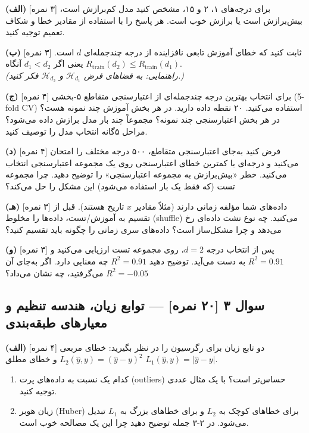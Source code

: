 \documentclass[12pt,a4paper]{article}
\begin{document}
\textbf{(الف)} [۳ نمره] برای درجه‌های ۱، ۲ و ۱۵، مشخص کنید مدل کم‌برازش است، بیش‌برازش است یا برازش خوب است. هر پاسخ را با استفاده از مقادیر خطا و شکاف تعمیم توجیه کنید.

\bigskip

\textbf{(ب)} [۳ نمره] ثابت کنید که خطای آموزش تابعی نافزاینده از درجه چندجمله‌ای $d$ است. یعنی اگر $d_1 < d_2$ آنگاه $R_{\text{train}}(d_2) \leq R_{\text{train}}(d_1)$.\\
\textit{(راهنمایی: به فضاهای فرض $\mathcal{H}_{d_1}$ و $\mathcal{H}_{d_2}$ فکر کنید.)}

\bigskip

\textbf{(ج)} [۴ نمره] برای انتخاب بهترین درجه چندجمله‌ای از اعتبارسنجی متقاطع ۵-بخشی (5-fold CV) استفاده می‌کنید. ۲۰ نقطه داده دارید. در هر بخش آموزش چند نمونه هست؟ در هر بخش اعتبارسنجی چند نمونه؟ مجموعاً چند بار مدل برازش داده می‌شود؟ مراحل ۵گانه انتخاب مدل را توصیف کنید.

\bigskip

\textbf{(د)} [۴ نمره] فرض کنید به‌جای اعتبارسنجی متقاطع، ۵۰۰ درجه مختلف را امتحان می‌کنید و درجه‌ای با کمترین خطای اعتبارسنجی روی یک مجموعه اعتبارسنجی انتخاب می‌کنید. خطر «بیش‌برازش به مجموعه اعتبارسنجی» را توضیح دهید. چرا مجموعه تست (که فقط یک بار استفاده می‌شود) این مشکل را حل می‌کند؟

\bigskip

\textbf{(هـ)} [۳ نمره] داده‌های شما مؤلفه زمانی دارند (مثلاً مقادیر $x$ تاریخ هستند). قبل از تقسیم به آموزش/تست، داده‌ها را مخلوط (shuffle) می‌کنید. چه نوع نشت داده‌ای رخ می‌دهد و چرا مشکل‌ساز است؟ داده‌های سری زمانی را چگونه باید تقسیم کنید؟

\bigskip

\textbf{(و)} [۳ نمره] پس از انتخاب درجه $d=2$، روی مجموعه تست ارزیابی می‌کنید و $R^2 = 0.91$ به دست می‌آید. توضیح دهید $R^2 = 0.91$ چه معنایی دارد. اگر به‌جای آن $R^2 = -0.05$ می‌گرفتید، چه نشان می‌داد؟

\newpage

\subsection*{سوال ۳ [۲۰ نمره] — توابع زیان، هندسه تنظیم و معیارهای طبقه‌بندی}

\textbf{(الف)} [۴ نمره] دو تابع زیان برای رگرسیون را در نظر بگیرید: خطای مربعی $L_2(\hat{y}, y) = (\hat{y}-y)^2$ و خطای مطلق $L_1(\hat{y}, y) = |\hat{y}-y|$.

\begin{enumerate}[label=(\roman*)]
\item کدام یک نسبت به داده‌های پرت (outliers) حساس‌تر است؟ با یک مثال عددی توجیه کنید.
\item زیان هوبر (Huber) برای خطاهای کوچک به $L_2$ و برای خطاهای بزرگ به $L_1$ تبدیل می‌شود. در ۲-۳ جمله توضیح دهید چرا این یک مصالحه خوب است.
\end{enumerate}
\end{document}

